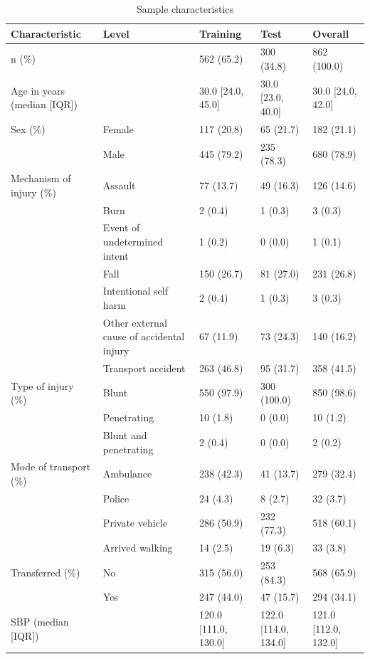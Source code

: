 \documentclass[10pt,letterpaper]{article}\usepackage[]{graphicx}\usepackage[]{color}
\begin{document}
\begin{table}[ht]
\centering
\caption{Sample characteristics} 
\label{tab:sample-characteristics}
\begin{adjustbox}{max width=\textwidth} 
\begin{tabular} 
{lllll}
  \hline
Characteristic & Level & Training & Test & Overall \\ 
  \hline
n (\%) &  & 562 (65.2) & 300 (34.8) & 862 (100.0) \\ 
  Age in years (median [IQR]) &  & 30.0 [24.0, 45.0] & 30.0 [23.0, 40.0] & 30.0 [24.0, 42.0] \\ 
  Sex (\%) & Female & 117 (20.8) & 65 (21.7) & 182 (21.1) \\ 
   & Male & 445 (79.2) & 235 (78.3) & 680 (78.9) \\ 
  Mechanism of injury (\%) & Assault & 77 (13.7) & 49 (16.3) & 126 (14.6) \\ 
   & Burn & 2 (0.4) & 1 (0.3) & 3 (0.3) \\ 
   & Event of undetermined intent & 1 (0.2) & 0 (0.0) & 1 (0.1) \\ 
   & Fall & 150 (26.7) & 81 (27.0) & 231 (26.8) \\ 
   & Intentional self harm & 2 (0.4) & 1 (0.3) & 3 (0.3) \\ 
   & Other external cause of accidental injury & 67 (11.9) & 73 (24.3) & 140 (16.2) \\ 
   & Transport accident & 263 (46.8) & 95 (31.7) & 358 (41.5) \\ 
  Type of injury (\%) & Blunt & 550 (97.9) & 300 (100.0) & 850 (98.6) \\ 
   & Penetrating & 10 (1.8) & 0 (0.0) & 10 (1.2) \\ 
   & Blunt and penetrating & 2 (0.4) & 0 (0.0) & 2 (0.2) \\ 
  Mode of transport (\%) & Ambulance & 238 (42.3) & 41 (13.7) & 279 (32.4) \\ 
   & Police & 24 (4.3) & 8 (2.7) & 32 (3.7) \\ 
   & Private vehicle & 286 (50.9) & 232 (77.3) & 518 (60.1) \\ 
   & Arrived walking & 14 (2.5) & 19 (6.3) & 33 (3.8) \\ 
  Transferred (\%) & No & 315 (56.0) & 253 (84.3) & 568 (65.9) \\ 
   & Yes & 247 (44.0) & 47 (15.7) & 294 (34.1) \\ 
  SBP (median [IQR]) &  & 120.0 [111.0, 130.0] & 122.0 [114.0, 134.0] & 121.0 [112.0, 132.0] \\ 

\end{tabular}
\end{adjustbox}
\end{table}
\end{document}

